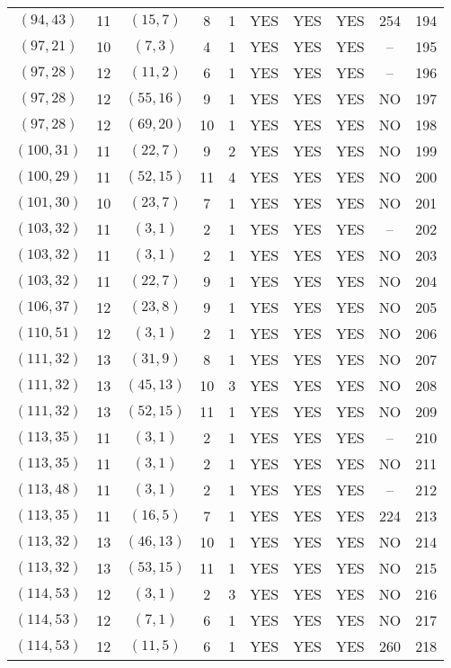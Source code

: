 \begin{longtable}{|c|c|c|c|c|c|c|c|c|c|}
$(94, 43)$ & 11 & $(15, 7)$ & 8 & 1 & YES & YES & YES & 254 & 194\\
$(97, 21)$ & 10 & $(7, 3)$ & 4 & 1 & YES & YES & YES & -- & 195\\
$(97, 28)$ & 12 & $(11, 2)$ & 6 & 1 & YES & YES & YES & -- & 196\\
$(97, 28)$ & 12 & $(55, 16)$ & 9 & 1 & YES & YES & YES & NO & 197\\
$(97, 28)$ & 12 & $(69, 20)$ & 10 & 1 & YES & YES & YES & NO & 198\\
$(100, 31)$ & 11 & $(22, 7)$ & 9 & 2 & YES & YES & YES & NO & 199\\
$(100, 29)$ & 11 & $(52, 15)$ & 11 & 4 & YES & YES & YES & NO & 200\\
$(101, 30)$ & 10 & $(23, 7)$ & 7 & 1 & YES & YES & YES & NO & 201\\
$(103, 32)$ & 11 & $(3, 1)$ & 2 & 1 & YES & YES & YES & -- & 202\\
$(103, 32)$ & 11 & $(3, 1)$ & 2 & 1 & YES & YES & YES & NO & 203\\
$(103, 32)$ & 11 & $(22, 7)$ & 9 & 1 & YES & YES & YES & NO & 204\\
$(106, 37)$ & 12 & $(23, 8)$ & 9 & 1 & YES & YES & YES & NO & 205\\
$(110, 51)$ & 12 & $(3, 1)$ & 2 & 1 & YES & YES & YES & NO & 206\\
$(111, 32)$ & 13 & $(31, 9)$ & 8 & 1 & YES & YES & YES & NO & 207\\
$(111, 32)$ & 13 & $(45, 13)$ & 10 & 3 & YES & YES & YES & NO & 208\\
$(111, 32)$ & 13 & $(52, 15)$ & 11 & 1 & YES & YES & YES & NO & 209\\
$(113, 35)$ & 11 & $(3, 1)$ & 2 & 1 & YES & YES & YES & -- & 210\\
$(113, 35)$ & 11 & $(3, 1)$ & 2 & 1 & YES & YES & YES & NO & 211\\
$(113, 48)$ & 11 & $(3, 1)$ & 2 & 1 & YES & YES & YES & -- & 212\\
$(113, 35)$ & 11 & $(16, 5)$ & 7 & 1 & YES & YES & YES & 224 & 213\\
$(113, 32)$ & 13 & $(46, 13)$ & 10 & 1 & YES & YES & YES & NO & 214\\
$(113, 32)$ & 13 & $(53, 15)$ & 11 & 1 & YES & YES & YES & NO & 215\\
$(114, 53)$ & 12 & $(3, 1)$ & 2 & 3 & YES & YES & YES & NO & 216\\
$(114, 53)$ & 12 & $(7, 1)$ & 6 & 1 & YES & YES & YES & NO & 217\\
$(114, 53)$ & 12 & $(11, 5)$ & 6 & 1 & YES & YES & YES & 260 & 218\\

\end{longtable}
